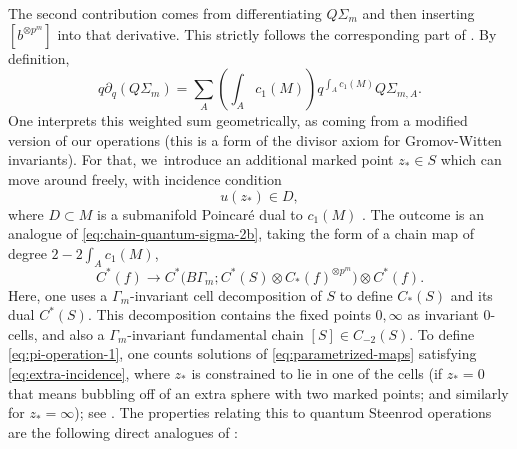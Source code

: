 \documentclass[10pt,a4paper]{amsart}
\theoremstyle{plain}
\theoremstyle{definition}
\begin{document}
The second contribution comes from differentiating $Q\Sigma_m$ and then inserting $[b^{\otimes p^m}]$ into that derivative. This strictly follows the corresponding part of \cite{seidel-wilkins21}. By definition,
\begin{equation*}
q\partial_q (Q\Sigma_m) = \sum_A ({\textstyle \int_A c_1(M)}) q^{\int_A c_1(M)} Q\Sigma_{m,A}.
\end{equation*}
One interprets this weighted sum geometrically, as coming from a modified version of our operations (this is a form of the divisor axiom for Gromov-Witten invariants). For that, we~introduce an additional marked point $z_* \in S$ which can move around freely, with incidence condition
\begin{equation}\label{eq:extra-incidence}
u(z_*) \in D,
\end{equation}
where $D \subset M$ is a submanifold Poincaré dual to $c_1(M)$ . The outcome is an analogue of \eqref{eq:chain-quantum-sigma-2b}, taking the form of a chain map of degree $2-2\int_A c_1(M)$,
\begin{equation}\label{eq:pi-operation-1}
C^*(f) \to C^*\bigl(B\Gamma_m;C^*(S) \otimes C_*(f)^{\otimes p^m}\bigr) \otimes C^*(f).
\end{equation}
Here, one uses a $\Gamma_m$-invariant cell decomposition of $S$ \cite[\S 2c]{seidel-wilkins21} to define $C_*(S)$ and its dual $C^*(S)$. This decomposition contains the fixed points $0,\infty$ as invariant $0$-cells, and also a $\Gamma_m$-invariant fundamental chain $[S] \in C_{-2}(S)$. To define \eqref{eq:pi-operation-1}, one counts solutions of \eqref{eq:parametrized-maps} satisfying \eqref{eq:extra-incidence}, where $z_*$ is constrained to lie in one of the cells (if $z_* = 0$ that means bubbling off of an extra sphere with two marked points; and similarly for $z_* = \infty$); see \cite[\S\S 4c \& 5a]{seidel-wilkins21}. The properties relating this to quantum Steenrod operations are the following direct analogues of \cite[Lem.\,5.2--Lem.\,5.4]{seidel-wilkins21}:
\end{document}
